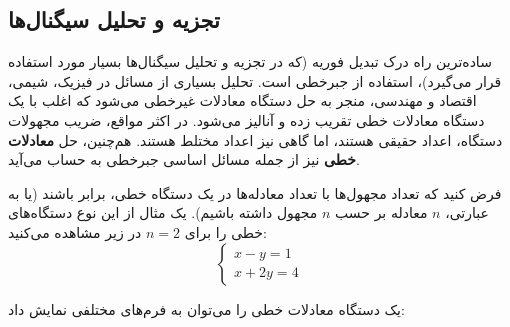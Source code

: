 \subsection{تجزیه و تحلیل سیگنال‌ها}
ساده‌ترین راه درک تبدیل فوریه (که در تجزیه و تحلیل سیگنال‌ها بسیار مورد استفاده قرار می‌گیرد)، استفاده از جبرخطی است.
تحلیل بسیاری از مسائل در فیزیک، شیمی، اقتصاد و مهندسی، منجر به حل دستگاه معادلات غیر‌خطی می‌شود که اغلب با یک دستگاه معادلات خطی تقریب زده و آنالیز می‌شود. در اکثر مواقع، ضریب مجهولات دستگاه، اعداد حقیقی هستند، اما گاهی نیز اعداد مختلط هستند. هم‌چنین، حل \textbf{معادلات خطی} نیز از جمله مسائل اساسی جبر‌خطی به حساب می‌آید.

فرض کنید که تعداد مجهول‌ها با تعداد معادله‌ها در یک دستگاه خطی، برابر باشند (یا به عبارتی، $n$ معادله بر حسب $n$ مجهول داشته باشیم). یک مثال از این نوع دستگاه‌های خطی را برای $n=2$ در زیر مشاهده می‌کنید:
\begin{equation}
	\begin{cases}
		x - y = 1 \\[0.2cm]
		x + 2y = 4
	\end{cases}
\end{equation}

یک دستگاه معادلات خطی را می‌توان به فرم‌های مختلفی نمایش داد:

